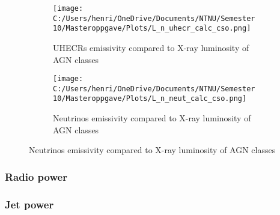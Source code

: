\begin{figure}[ht]
    \centering
    \begin{subfigure}[b]{0.49\textwidth}
        \centering
        \texttt{[image: C:/Users/henri/OneDrive/Documents/NTNU/Semester 10/Masteroppgave/Plots/L\_n\_uhecr\_calc\_cso.png]}
        \caption{UHECRs emissivity compared to X-ray luminosity of 
        AGN classes }
        \label{fig:uhecr_em}
    \end{subfigure}
    \hfill
    \begin{subfigure}[b]{0.49\textwidth}
        \centering
        \texttt{[image: C:/Users/henri/OneDrive/Documents/NTNU/Semester 10/Masteroppgave/Plots/L\_n\_neut\_calc\_cso.png]}
        \caption{Neutrinos emissivity compared to X-ray luminosity of AGN classes}
        \label{fig:neut_em}
    \end{subfigure}
    \label{fig:X-ray_em}
\end{figure}


\subsubsection{Radio power}



\subsubsection{Jet power}






